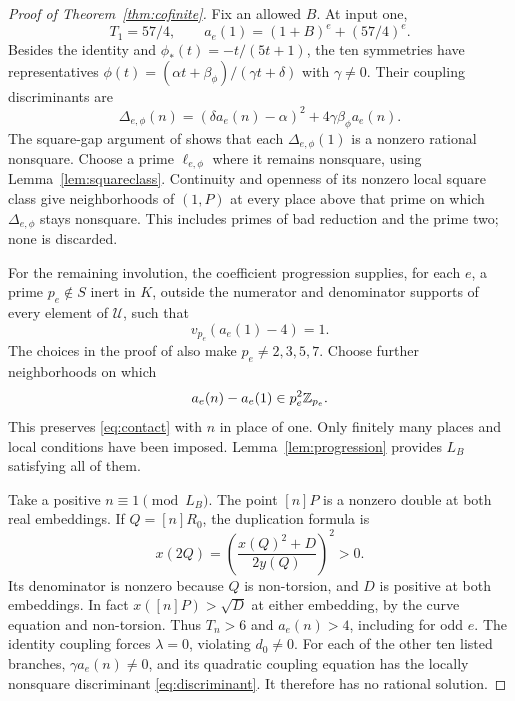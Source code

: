 \documentclass[11pt,a4paper]{article}
\begin{document}
\begin{proof}[Proof of Theorem~\ref{thm:cofinite}]
Fix an allowed $B$. At input one,
\[
 T_1=57/4,\qquad a_e(1)=(1+B)^e+(57/4)^e.
\]
Besides the identity and $\phi_*(t)=-t/(5t+1)$, the ten
symmetries have representatives
$\phi(t)=(\alpha t+\beta_\phi)/(\gamma t+\delta)$ with
$\gamma\ne0$. Their coupling discriminants are
\begin{equation}\label{eq:discriminant}
 \Delta_{e,\phi}(n)
       =(\delta a_e(n)-\alpha)^2
                         +4\gamma\beta_\phi a_e(n).
\end{equation}
The square-gap argument of \cite[Lemma~2.2]{Mobius} shows that
each $\Delta_{e,\phi}(1)$ is a nonzero rational nonsquare.
Choose a prime $\ell_{e,\phi}$ where it remains nonsquare,
using Lemma~\ref{lem:squareclass}. Continuity and openness of
its nonzero local square class give neighborhoods of $(1,P)$
at every place above that prime on which
$\Delta_{e,\phi}$ stays nonsquare. This includes primes of
bad reduction and the prime two; none is discarded.

For the remaining involution, the coefficient progression supplies,
for each $e$, a prime $p_e\notin S$ inert in $K$, outside the
numerator and denominator supports of every element of
$\mathcal U$, such that
\begin{equation}\label{eq:contact}
                         v_{p_e}(a_e(1)-4)=1.
\end{equation}
The choices in the proof of \cite[Theorem~1.1]{Mobius} also make
$p_e\ne2,3,5,7$. Choose further neighborhoods on which
\[
                     a_e(n)-a_e(1)\in p_e^2\mathbb Z_{p_e}.
\]
This preserves \eqref{eq:contact} with $n$ in place of one.
Only finitely many places and local conditions have been imposed.
Lemma~\ref{lem:progression} provides $L_B$ satisfying all of them.

Take a positive $n\equiv1\pmod{L_B}$. The point $[n]P$ is a
nonzero double at both real embeddings. If $Q=[n]R_0$, the
duplication formula is
\[
                 x(2Q)=\left(\frac{x(Q)^2+D}{2y(Q)}\right)^2>0.
\]
Its denominator is nonzero because $Q$ is non-torsion, and $D$
is positive at both embeddings. In fact $x([n]P)>\sqrt D$
at either embedding, by the curve equation and non-torsion.
Thus $T_n>6$ and $a_e(n)>4$, including for odd $e$.
The identity coupling forces $\lambda=0$, violating $d_0\ne0$.
For each of the other ten listed branches,
$\gamma a_e(n)\ne0$, and its quadratic coupling equation has
the locally nonsquare discriminant \eqref{eq:discriminant}.
It therefore has no rational solution.


\end{proof}
\end{document}
